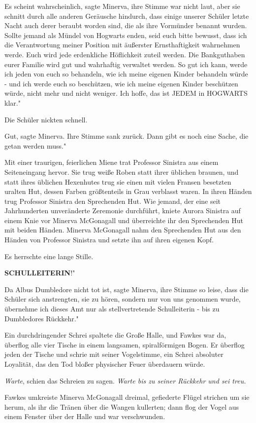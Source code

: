 \glqq Es scheint wahrscheinlich\grqq{}, sagte Minerva, ihre Stimme war nicht
laut, aber sie schnitt durch alle anderen Geräusche hindurch, \glqq dass einige
unserer Schüler letzte Nacht auch derer beraubt worden sind, die als ihre
Vormünder benannt wurden. Sollte jemand als Mündel von Hogwarts enden, seid euch
bitte bewusst, dass ich die Verantwortung meiner Position mit äußerster
Ernsthaftigkeit wahrnehmen werde. Euch wird jede erdenkliche Höflichkeit zuteil
werden. Die Bankguthaben eurer Familie wird gut und wahrhaftig verwaltet werden.
So gut ich kann, werde ich jeden von euch so behandeln, wie ich meine eigenen
Kinder behandeln würde - und ich werde euch so beschützen, wie ich meine eigenen
Kinder beschützen würde, nicht mehr und nicht weniger. Ich hoffe, das ist JEDEM
in HOGWARTS klar."

Die Schüler nickten schnell.

\glqq Gut\grqq{}, sagte Minerva. Ihre Stimme sank zurück. \glqq Dann gibt es
noch eine Sache, die getan werden muss."

Mit einer traurigen, feierlichen Miene trat Professor Sinistra aus einem
Seiteneingang hervor. Sie trug weiße Roben statt ihrer üblichen braunen, und
statt ihres üblichen Hexenhutes trug sie einen mit vielen Fransen besetzten
uralten Hut, dessen Farben größtenteils in Grau verblasst waren. In ihren Händen
trug Professor Sinistra den Sprechenden Hut. Wie jemand, der eine seit
Jahrhunderten unveränderte Zeremonie durchführt, kniete Aurora Sinistra auf
einem Knie vor Minerva McGonagall und überreichte ihr den Sprechenden Hut mit
beiden Händen. Minerva McGonagall nahm den Sprechenden Hut aus den Händen von
Professor Sinistra und setzte ihn auf ihren eigenen Kopf.

Es herrschte eine lange Stille.

\glqq \textbf{SCHULLEITERIN}!"

\glqq Da Albus Dumbledore nicht tot ist\grqq{}, sagte Minerva, ihre Stimme so
leise, dass die Schüler sich anstrengten, sie zu hören, \glqq sondern nur von
uns genommen wurde, übernehme ich dieses Amt nur als stellvertretende
Schulleiterin - bis zu Dumbledores Rückkehr."

Ein durchdringender Schrei spaltete die Große Halle, und Fawkes war da, überflog
alle vier Tische in einem langsamen, spiralförmigen Bogen. Er überflog jeden der
Tische und schrie mit seiner Vogelstimme, ein Schrei absoluter Loyalität, das
den Tod bloßer physischer Feuer überdauern würde.

\emph{Warte}, schien das Schreien zu sagen. \emph{Warte bis zu seiner Rückkehr
und sei treu.}

Fawkes umkreiste Minerva McGonagall dreimal, gefiederte Flügel strichen um sie
herum, als ihr die Tränen über die Wangen kullerten; dann flog der Vogel aus
einem Fenster über der Halle und war verschwunden.

